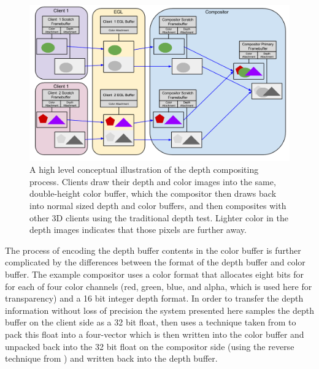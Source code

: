 \begin{figure}[ht!]
\centering
\includegraphics[width=1.0\textwidth]{images/depth-buffer-operation.png}
\caption{A high level conceptual illustration of the depth compositing process. Clients draw their depth and color images into the same, double-height color buffer, which the compositor then draws back into normal sized depth and color buffers, and then composites with other 3D clients using the traditional depth test. Lighter color in the depth images indicates that those pixels are further away.}
\end{figure}

The process of encoding the depth buffer contents in the color buffer is further complicated by the differences between the format of the depth buffer and color buffer. The example compositor uses a color format that allocates eight bits for for each of four color channels (red, green, blue, and alpha, which is used here for transparency) and a 16 bit integer depth format. In order to transfer the depth information without loss of precision the system presented here samples the depth buffer on the client side as a 32 bit float, then uses a technique taken from \cite{pack-float-rgba} to pack this float into a four-vector which is then written into the color buffer and unpacked back into the 32 bit float on the compositor side (using the reverse technique from \cite{pack-float-rgba}) and written back into the depth buffer. 

